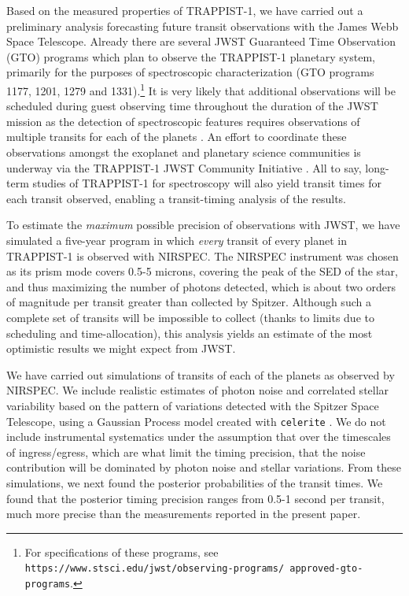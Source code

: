 \documentclass[twocolumn]{aastex63}
\begin{document}
Based on the measured properties of TRAPPIST-1, we have carried out a preliminary analysis forecasting future transit observations with the James Webb Space Telescope. Already there are several JWST Guaranteed Time Observation (GTO) programs which plan to observe the TRAPPIST-1 planetary system, primarily for the purposes of spectroscopic characterization (GTO programs 1177, 1201, 1279 and 1331).\footnote{For specifications of these programs, see \texttt{https://www.stsci.edu/jwst/observing-programs/ approved-gto-programs}.}  It is very likely that additional observations will be scheduled during guest observing  time throughout the duration of the JWST mission as the detection of spectroscopic features requires observations of multiple transits for each of the planets \citep{Morley2017,Barstow2016,Lustig-Yaeger2019,Fauchez2020b}.   An effort to coordinate these observations amongst the exoplanet and planetary science communities is underway via the TRAPPIST-1 JWST Community Initiative \citep{Gillon2020}.  All to say, long-term studies of TRAPPIST-1 for spectroscopy will also yield transit times for each transit observed, enabling a transit-timing analysis of the results.

To estimate the {\it maximum} possible precision of observations with JWST, we have simulated a five-year program in which {\it every} transit of every planet in TRAPPIST-1 is observed with NIRSPEC.   The NIRSPEC instrument was chosen as its prism mode covers 0.5-5 microns, covering the peak of the SED of the star, and thus maximizing the number of photons detected, which is about two orders of magnitude per transit greater than collected by Spitzer. Although such a complete set of transits will be impossible to collect (thanks to limits due to scheduling and time-allocation), this analysis yields an estimate of the most optimistic results we might expect from JWST.

We have carried out simulations of transits of each of the planets as observed by NIRSPEC.  We include realistic estimates of photon noise and correlated stellar variability based on the pattern of variations detected with the Spitzer Space Telescope, using a Gaussian Process model created with \texttt{celerite} \citep{ForemanMackey2017}.  We do not include instrumental systematics under the assumption that over the timescales of ingress/egress, which are what limit the timing precision, that the noise contribution will be dominated by photon noise and stellar variations.
From these simulations, we
next found the posterior probabilities of the transit times.   We found that the posterior timing precision ranges from 0.5-1 second per transit, much more precise than the measurements reported in the present paper.
\end{document}
